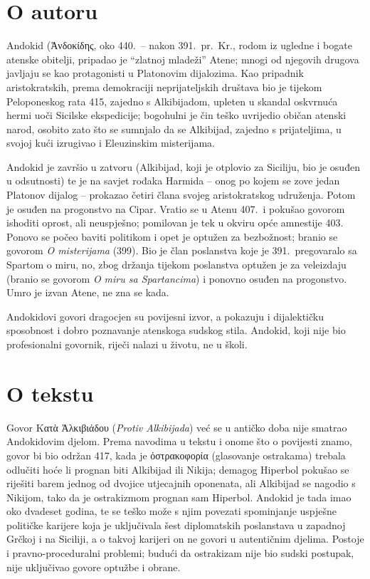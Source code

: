 \section*{O autoru}

Andokid (Ἀνδοκίδης, oko 440.\ – nakon 391.\ pr.~Kr., rodom iz ugledne i bogate atenske obitelji, pripadao je ``zlatnoj mladeži'' Atene; mnogi od njegovih drugova javljaju se kao protagonisti u Platonovim dijalozima. Kao pripadnik aristokratskih, prema demokraciji neprijateljskih društava bio je tijekom Peloponeskog rata 415, zajedno s Alkibijadom, upleten u skandal oskvrnuća hermi uoči Sicilske ekspedicije; bogohulni je čin teško uvrijedio običan atenski narod, osobito zato što se sumnjalo da se Alkibijad, zajedno s prijateljima, u svojoj kući izrugivao i Eleuzinskim misterijama.

Andokid je završio u zatvoru (Alkibijad, koji je otplovio za Siciliju, bio je osuđen u odsutnosti) te je na savjet rođaka Harmida – onog po kojem se zove jedan Platonov dijalog – prokazao četiri člana svojeg aristokratskog udruženja. Potom je osuđen na progonstvo na Cipar. Vratio se u Atenu 407.\ i pokušao govorom ishoditi oprost, ali neuspješno; pomilovan je tek u okviru opće amnestije 403. Ponovo se počeo baviti politikom i opet je optužen za bezbožnost; branio se govorom \textit{O misterijama} (399). Bio je član poslanstva koje je 391.\ pregovaralo sa Spartom o miru, no, zbog držanja tijekom poslanstva optužen je za veleizdaju (branio se govorom \textit{O miru sa Spartancima}) i ponovno osuđen na progonstvo. Umro je izvan Atene, ne zna se kada.

Andokidovi govori dragocjen su povijesni izvor, a pokazuju i dijalektičku sposobnost i dobro poznavanje atenskoga sudskog stila. Andokid, koji nije bio profesionalni govornik, riječi nalazi u životu, ne u školi.

\section*{O tekstu}

Govor Κατὰ Ἀλκιβιάδου (\textit{Protiv Alkibijada}) već se u antičko doba nije smatrao Andokidovim djelom. Prema navodima u tekstu i onome što o povijesti znamo, govor bi bio održan 417, kada je ὀστρακοφορία (glasovanje ostrakama) trebala odlučiti hoće li prognan biti Alkibijad ili Nikija; demagog Hiperbol pokušao se riješiti barem jednog od dvojice utjecajnih oponenata, ali Alkibijad se nagodio s Nikijom, tako da je ostrakizmom prognan sam Hiperbol. Andokid je tada imao oko dvadeset godina, te se teško može s njim povezati spominjanje uspješne političke karijere koja je uključivala šest diplomatskih poslanstava u zapadnoj Grčkoj i na Siciliji, a o takvoj karijeri on ne govori u autentičnim djelima. Postoje i pravno-proceduralni problemi; budući da ostrakizam nije bio sudski postupak, nije uključivao govore optužbe i obrane.

